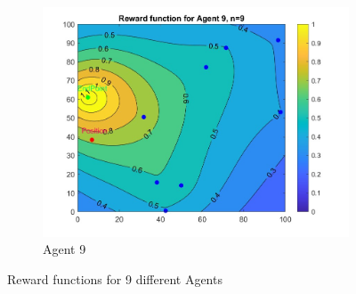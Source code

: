 \begin{figure}[h]
\begin{subfigure}[b]{0.3\textwidth}
         \includegraphics[width=\textwidth]{figures/RewardFunction9.jpg}
         \caption{Agent 9}
         \label{fig:r9}
     \end{subfigure}
        \caption{Reward functions for 9 different Agents}
        \label{fig:three graphs}
   
\end{figure}
\clearpage
